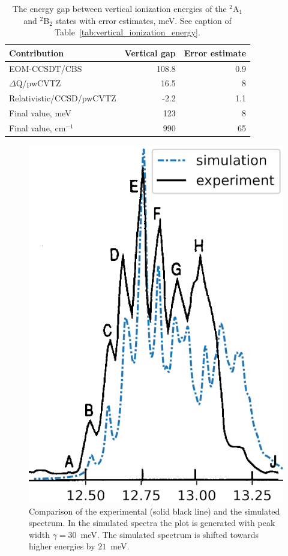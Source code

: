 \documentclass[
12pt,
a4paper,
prb,
superscriptaddress,
]{revtex4}
\begin{document}
\begin{table}
    \caption{
        The energy gap between vertical ionization energies of the $^2$A$_1$
        and $^2$B$_2$ states with error estimates, meV. See caption of
        Table~\ref{tab:vertical_ionization_energy}.
    }
    \label{tab:vertical_gap}
    \begin{center}
        \begin{tabular}[c]{|l|r|r|}
            \hline
            Contribution             &  Vertical gap    & Error estimate \\ \hline
            EOM-CCSDT/CBS            &  108.8           & 0.9 \\
            $\Delta$Q/pwCVTZ         &   16.5           & 8 \\
            Relativistic/CCSD/pwCVTZ &   -2.2           & 1.1 \\ \hline
            Final value, meV         &  123             & 8 \\
            Final value, cm$^{-1}$   &  990             & 65 \\ \hline
        \end{tabular}
    \end{center}
\end{table}

\begin{figure}
\includegraphics[width = 8 cm]{figures/sim_vs_Dyke}
\caption{
    Comparison of the experimental (solid black line) and the simulated
    spectrum. In the simulated spectra the plot is generated with peak width
    $\gamma = 30$~meV. The simulated spectrum is shifted towards higher
    energies by $21$~meV.
}
\label{fig:sim_vs_dyke}
\end{figure}
\end{document}
